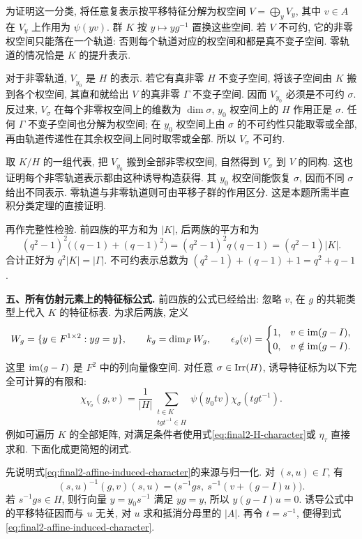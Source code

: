 \begin{solution}
为证明这一分类, 将任意复表示按平移特征分解为权空间
$V=\bigoplus_y V_y$, 其中 $v\in A$ 在 $V_y$ 上作用为 $\psi(yv)$. 群 $K$ 按 $y\mapsto yg^{-1}$ 置换这些空间. 若 $V$ 不可约, 它的非零权空间只能落在一个轨道: 否则每个轨道对应的权空间和都是真不变子空间. 零轨道的情况恰是 $K$ 的提升表示.

对于非零轨道, $V_{y_0}$ 是 $H$ 的表示. 若它有真非零 $H$ 不变子空间, 将该子空间由 $K$ 搬到各个权空间, 其直和就给出 $V$ 的真非零 $\Gamma$ 不变子空间. 因而 $V_{y_0}$ 必须是不可约 $\sigma$. 反过来, $V_\sigma$ 在每个非零权空间上的维数为 $\dim\sigma$, $y_0$ 权空间上的 $H$ 作用正是 $\sigma$. 任何 $\Gamma$ 不变子空间也分解为权空间; 在 $y_0$ 权空间上由 $\sigma$ 的不可约性只能取零或全部, 再由轨道传递性在其余权空间上同时取零或全部. 所以 $V_\sigma$ 不可约.

取 $K/H$ 的一组代表, 把 $V_{y_0}$ 搬到全部非零权空间, 自然得到 $V_\sigma$ 到 $V$ 的同构. 这也证明每个非零轨道表示都由这种诱导构造获得. 其 $y_0$ 权空间能恢复 $\sigma$, 因而不同 $\sigma$ 给出不同表示. 零轨道与非零轨道则可由平移子群的作用区分. 这是本题所需半直积分类定理的直接证明.

再作完整性检验. 前四族的平方和为 $|K|$, 后两族的平方和为
\[
 (q^2-1)^2\bigl((q-1)+(q-1)^2\bigr)
 =(q^2-1)^2q(q-1)=(q^2-1)|K|.
\]
合计正好为 $q^2|K|=|\Gamma|$. 不可约表示总数为
$(q^2-1)+(q-1)+1=q^2+q-1$.

\textbf{五、所有仿射元素上的特征标公式.}
前四族的公式已经给出: 忽略 $v$, 在 $g$ 的共轭类型上代入 $K$ 的特征标表. 为求后两族, 定义
\[
 W_g=\{y\in F^{1\times2}:yg=y\},\qquad
 k_g=\dim_F W_g,\qquad
 \epsilon_g(v)=
 \begin{cases}1,&v\in\operatorname{im}(g-I),\\0,&v\notin\operatorname{im}(g-I).\end{cases}
\]
这里 $\operatorname{im}(g-I)$ 是 $F^2$ 中的列向量像空间. 对任意 $\sigma\in\operatorname{Irr}(H)$, 诱导特征标为以下完全可计算的有限和:
\begin{equation}\label{eq:final2-affine-induced-character}
 \chi_{V_\sigma}(g,v)=\frac1{|H|}
 \sum_{\substack{t\in K\\tgt^{-1}\in H}}
 \psi(y_0tv)\chi_\sigma(tgt^{-1}).
\end{equation}
例如可遍历 $K$ 的全部矩阵, 对满足条件者使用式\eqref{eq:final2-H-character}或 $\eta_\tau$ 直接求和. 下面化成更简短的闭式.

先说明式\eqref{eq:final2-affine-induced-character}的来源与归一化. 对 $(s,u)\in\Gamma$, 有
\[
 (s,u)^{-1}(g,v)(s,u)
 =\bigl(s^{-1}gs,\ s^{-1}(v+(g-I)u)\bigr).
\]
若 $s^{-1}gs\in H$, 则行向量 $y=y_0s^{-1}$ 满足 $yg=y$, 所以 $y(g-I)u=0$. 诱导公式中的平移特征因而与 $u$ 无关, 对 $u$ 求和抵消分母里的 $|A|$. 再令 $t=s^{-1}$, 便得到式\eqref{eq:final2-affine-induced-character}.


\end{solution}
